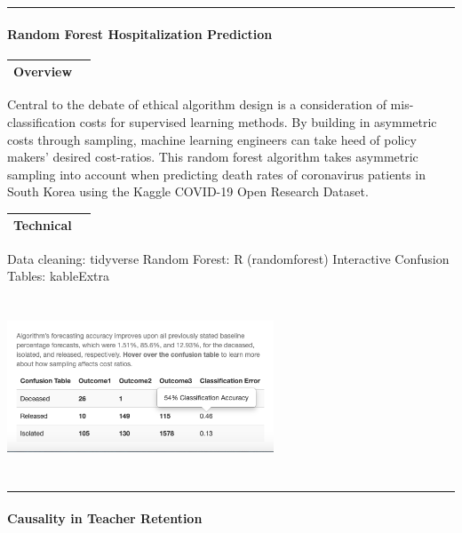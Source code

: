 \documentclass[
]{article}
\begin{document}
\begin{center}\rule{0.5\linewidth}{0.5pt}\end{center}

\hypertarget{random-forest-hospitalization-prediction}{%
\paragraph{Random Forest Hospitalization
Prediction}\label{random-forest-hospitalization-prediction}}

\begin{longtable}[]{@{}lr@{}}
\toprule
Overview & \\
\midrule
\endhead
\bottomrule
\end{longtable}

Central to the debate of ethical algorithm design is a consideration of
mis-classification costs for supervised learning methods. By building in
asymmetric costs through sampling, machine learning engineers can take
heed of policy makers' desired cost-ratios. This random forest algorithm
takes asymmetric sampling into account when predicting death rates of
coronavirus patients in South Korea using the Kaggle COVID-19 Open
Research Dataset.

\begin{longtable}[]{@{}lr@{}}
\toprule
Technical & \\
\midrule
\endhead
\bottomrule
\end{longtable}

Data cleaning: tidyverse Random Forest: R (randomforest) Interactive
Confusion Tables: kableExtra

\includegraphics[width=300px,height=200]{images/rf1}

\begin{center}\rule{0.5\linewidth}{0.5pt}\end{center}

\hypertarget{causality-in-teacher-retention}{%
\paragraph{Causality in Teacher
Retention}\label{causality-in-teacher-retention}}
\end{document}
